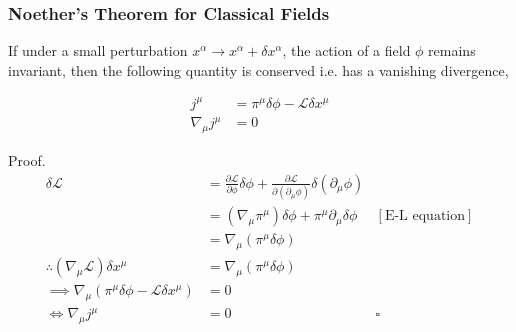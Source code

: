 \documentclass{beamer}
\begin{document}
\begin{frame}
\frametitle{Noether's Theorem for Classical Fields}

\begin{theorem}

If under a small perturbation $x^\alpha \to x^\alpha + \delta x^\alpha$, the action of a field $\phi$ remains invariant, then the following quantity is conserved i.e. has a vanishing divergence,

\begin{align*}
j^\mu & = \pi^\mu \delta \phi - \mathcal{L} \delta x^\mu \\
\nabla_\mu j^\mu & = 0
\end{align*}
\end{theorem}
\end{frame}

\begin{frame}
\begin{block}{Proof.}
\begin{align*}
\delta \mathcal{L} & = \frac{\partial \mathcal{L}}{\partial \phi} \delta \phi + \frac{\partial \mathcal{L}}{\partial \left( \partial_\mu \phi \right)} \delta \left( \partial_\mu \phi \right) \\
& = \left( \nabla_\mu \pi^\mu \right) \delta \phi + \pi^\mu \partial_\mu \delta \phi & \left[ \text{E-L equation} \right] \\
& = \nabla_\mu \left( \pi^\mu \delta \phi \right) \\
\therefore \left( \nabla_\mu \mathcal{L} \right) \delta x^\mu & = \nabla_\mu \left( \pi^\mu \delta \phi \right) \\
\implies \nabla_\mu \left( \pi^\mu \delta \phi - \mathcal{L} \delta x^\mu \right) & = 0 \\
\Longleftrightarrow \nabla_\mu j^\mu & = 0 & \square
\end{align*}
\end{block}
\end{frame}
\end{document}

